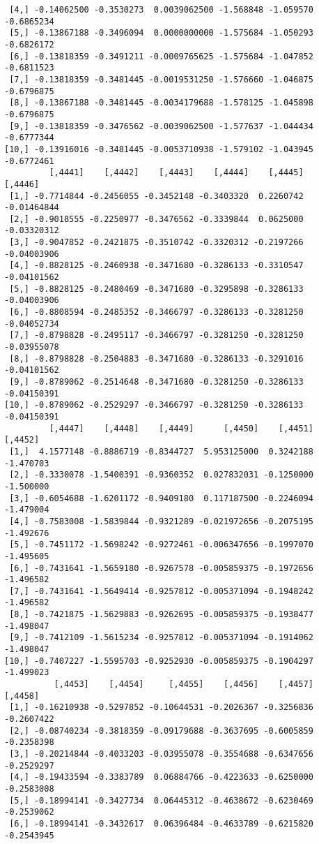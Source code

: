 \documentclass[
  letterpaper,
  DIV=11,
  numbers=noendperiod]{scrreprt}
\begin{document}
\begin{verbatim}
 [4,] -0.14062500 -0.3530273  0.0039062500 -1.568848 -1.059570 -0.6865234
 [5,] -0.13867188 -0.3496094  0.0000000000 -1.575684 -1.050293 -0.6826172
 [6,] -0.13818359 -0.3491211 -0.0009765625 -1.575684 -1.047852 -0.6811523
 [7,] -0.13818359 -0.3481445 -0.0019531250 -1.576660 -1.046875 -0.6796875
 [8,] -0.13867188 -0.3481445 -0.0034179688 -1.578125 -1.045898 -0.6796875
 [9,] -0.13818359 -0.3476562 -0.0039062500 -1.577637 -1.044434 -0.6777344
[10,] -0.13916016 -0.3481445 -0.0053710938 -1.579102 -1.043945 -0.6772461
         [,4441]    [,4442]    [,4443]    [,4444]    [,4445]     [,4446]
 [1,] -0.7714844 -0.2456055 -0.3452148 -0.3403320  0.2260742 -0.01464844
 [2,] -0.9018555 -0.2250977 -0.3476562 -0.3339844  0.0625000 -0.03320312
 [3,] -0.9047852 -0.2421875 -0.3510742 -0.3320312 -0.2197266 -0.04003906
 [4,] -0.8828125 -0.2460938 -0.3471680 -0.3286133 -0.3310547 -0.04101562
 [5,] -0.8828125 -0.2480469 -0.3471680 -0.3295898 -0.3286133 -0.04003906
 [6,] -0.8808594 -0.2485352 -0.3466797 -0.3286133 -0.3281250 -0.04052734
 [7,] -0.8798828 -0.2495117 -0.3466797 -0.3281250 -0.3281250 -0.03955078
 [8,] -0.8798828 -0.2504883 -0.3471680 -0.3286133 -0.3291016 -0.04101562
 [9,] -0.8789062 -0.2514648 -0.3471680 -0.3281250 -0.3286133 -0.04150391
[10,] -0.8789062 -0.2529297 -0.3466797 -0.3281250 -0.3286133 -0.04150391
         [,4447]    [,4448]    [,4449]      [,4450]    [,4451]   [,4452]
 [1,]  4.1577148 -0.8886719 -0.8344727  5.953125000  0.3242188 -1.470703
 [2,] -0.3330078 -1.5400391 -0.9360352  0.027832031 -0.1250000 -1.500000
 [3,] -0.6054688 -1.6201172 -0.9409180  0.117187500 -0.2246094 -1.479004
 [4,] -0.7583008 -1.5839844 -0.9321289 -0.021972656 -0.2075195 -1.492676
 [5,] -0.7451172 -1.5698242 -0.9272461 -0.006347656 -0.1997070 -1.495605
 [6,] -0.7431641 -1.5659180 -0.9267578 -0.005859375 -0.1972656 -1.496582
 [7,] -0.7431641 -1.5649414 -0.9257812 -0.005371094 -0.1948242 -1.496582
 [8,] -0.7421875 -1.5629883 -0.9262695 -0.005859375 -0.1938477 -1.498047
 [9,] -0.7412109 -1.5615234 -0.9257812 -0.005371094 -0.1914062 -1.498047
[10,] -0.7407227 -1.5595703 -0.9252930 -0.005859375 -0.1904297 -1.499023
          [,4453]    [,4454]     [,4455]    [,4456]    [,4457]    [,4458]
 [1,] -0.16210938 -0.5297852 -0.10644531 -0.2026367 -0.3256836 -0.2607422
 [2,] -0.08740234 -0.3818359 -0.09179688 -0.3637695 -0.6005859 -0.2358398
 [3,] -0.20214844 -0.4033203 -0.03955078 -0.3554688 -0.6347656 -0.2529297
 [4,] -0.19433594 -0.3383789  0.06884766 -0.4223633 -0.6250000 -0.2583008
 [5,] -0.18994141 -0.3427734  0.06445312 -0.4638672 -0.6230469 -0.2539062
 [6,] -0.18994141 -0.3432617  0.06396484 -0.4633789 -0.6215820 -0.2543945

\end{verbatim}
\end{document}

